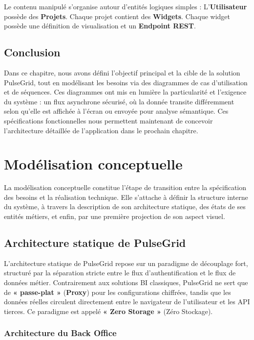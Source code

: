 ﻿\documentclass[12pt,a4paper,oneside]{report} %
\begin{document}
Le contenu manipulé s'organise autour d'entités logiques simples : L'\textbf{Utilisateur} possède des \textbf{Projets}. Chaque projet contient des \textbf{Widgets}. Chaque widget possède une définition de visualisation et un \textbf{Endpoint REST}.

\section{Conclusion}

Dans ce chapitre, nous avons défini l'objectif principal et la cible de la solution PulseGrid, tout en modélisant les besoins via des diagrammes de cas d'utilisation et de séquences. Ces diagrammes ont mis en lumière la particularité et l'exigence du système : un flux asynchrone sécurisé, où la donnée transite différemment selon qu'elle est affichée à l'écran ou envoyée pour analyse sémantique. Ces spécifications fonctionnelles nous permettent maintenant de concevoir l'architecture détaillée de l'application dans le prochain chapitre.

\chapter{Modélisation conceptuelle}

La modélisation conceptuelle constitue l'étape de transition entre la spécification des besoins et la réalisation technique. Elle s'attache à définir la structure interne du système, à travers la description de son architecture statique, des états de ses entités métiers, et enfin, par une première projection de son aspect visuel. 

\section{Architecture statique de PulseGrid}

L'architecture statique de PulseGrid repose sur un paradigme de découplage fort, structuré par la séparation stricte entre le flux d'authentification et le flux de données métier. Contrairement aux solutions BI classiques, PulseGrid ne sert que de \textbf{« passe-plat »} (\textbf{Proxy}) pour les configurations chiffrées, tandis que les données réelles circulent directement entre le navigateur de l'utilisateur et les API tierces. Ce paradigme est appelé \textbf{« Zero Storage »} (Zéro Stockage).

\subsection{Architecture du Back Office}
\end{document}
